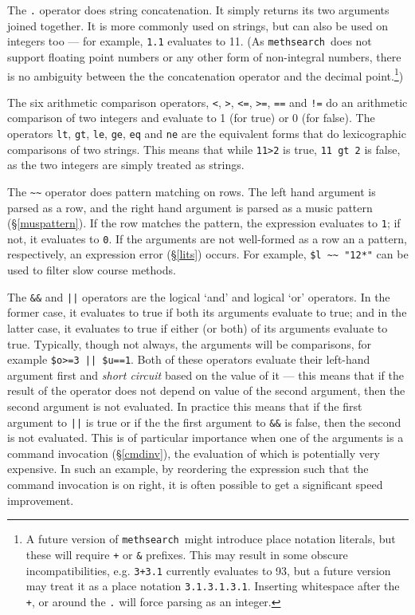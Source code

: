 \documentclass[a4paper,11pt,oneside]{book}
\def\methsearch{\texttt{meth\-search}}
\newcommand{\sref}[1]{\hyperref[#1]{\S\ref{#1}}}
\begin{document}
The \verb+.+ operator does string concatenation.  
It simply returns its two arguments joined together.  It is more commonly
used on strings, but can also be used on integers too --- for example,
\verb+1.1+ evaluates to 11.  (As \methsearch\ does not support floating 
point numbers or any other form of non-integral
numbers, there is no ambiguity between the the concatenation operator and 
the decimal point.\footnote{A future version of \methsearch\ might introduce
place notation literals, but these will require \verb-+- or \verb+&+ prefixes.
This may result in some obscure incompatibilities, e.g. \verb-3+3.1- currently
evaluates to 93, but a future version may treat it as a place notation 
\verb+3.1.3.1.3.1+.  Inserting whitespace after the \verb-+-, or around the
\verb+.+ will force parsing as an integer.})

The six arithmetic comparison operators, 
\verb+<+, \verb+>+, \verb+<=+, \verb+>=+, \verb+==+ and \verb+!=+ 
do an arithmetic comparison of two integers 
and evaluate to 1 (for true) or 0 (for false).   The operators 
\verb+lt+, \verb+gt+, \verb+le+, \verb+ge+, \verb+eq+ and \verb+ne+
are the equivalent forms that do lexicographic comparisons of two strings.  This means that while \verb+11>2+ is true,
\verb+11 gt 2+ is false, as the two integers are simply treated as strings.

The \verb+~~+ operator does pattern matching on rows.  The left hand argument 
is parsed as a row, and the right hand argument is parsed as a
music pattern (\sref{muspattern}).  If the row matches the pattern, the
expression evaluates to \verb+1+; if not, it evaluates to \verb+0+.  If
the arguments are not well-formed as a row an a pattern, respectively, an
expression error (\sref{lits}) occurs.  For example, \verb+$l ~~ "12*"+ can
be used to filter slow course methods.

The \verb+&&+ and \verb+||+ operators are the logical `and' and logical `or'
operators.  
In the former case, it evaluates to true if both its arguments 
evaluate to true; and in the latter case, it evaluates to true if either 
(or both) of its arguments evaluate to true.  Typically, though not always, 
the arguments will be comparisons, for example \texttt{\$o>=3 || \$u==1}.
Both of these operators evaluate their left-hand argument first and 
\textit{short circuit} 
based on the value of it --- this means that if
the result of the operator does not depend on value of the second argument,
then the second argument is not evaluated.  In practice this means that if
the first argument to \verb+||+ is true or if the 
the first argument to \verb+&&+ is false, then the second is not evaluated.
This is of particular importance when one of the arguments is a command
invocation (\sref{cmdinv}), the evaluation of which is potentially very
expensive. In such an example, by reordering the expression such that the
command invocation is on right, it is often possible to get a significant
speed improvement.
\end{document}

